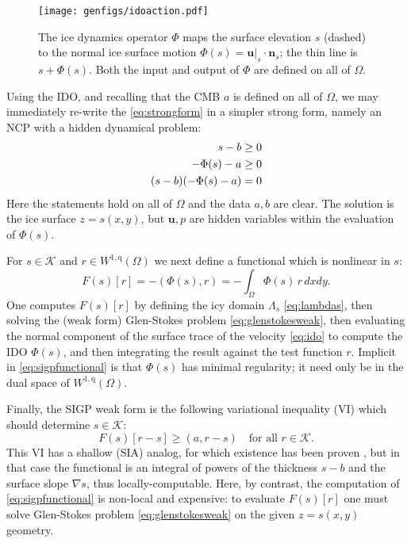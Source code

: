 \documentclass[letterpaper,final,12pt,reqno]{amsart}
\theoremstyle{claim}
\newcommand{\grad}{\nabla}
\newcommand{\bn}{\mathbf{n}}
\newcommand{\bu}{\mathbf{u}}
\newcommand{\ip}[2]{\left(#1,#2\right)}
\newcommand{\qq}{{\text{q}}}
\numberwithin{equation}{section}
\numberwithin{figure}{section}
\numberwithin{table}{section}
\numberwithin{theorem}{section}
\begin{document}
\begin{figure}[t]
\begin{center}
\texttt{[image: genfigs/idoaction.pdf]}
\end{center}
\caption{The ice dynamics operator $\Phi$ maps the surface elevation $s$ (dashed) to the normal ice surface motion $\Phi(s)=\bu|_s \cdot \bn_s$; the thin line is $s+\Phi(s)$.  Both the input and output of $\Phi$ are defined on all of $\Omega$.}
\label{fig:idoaction}
\end{figure}

Using the IDO, and recalling that the CMB $a$ is defined on all of $\Omega$, we may immediately re-write the \eqref{eq:strongform} in a simpler strong form, namely an NCP with a hidden dynamical problem:
\begin{align}
s - b &\ge 0  \label{eq:idostrongform} \\
- \Phi(s) - a &\ge 0 \notag \\
(s - b) (- \Phi(s) - a) &= 0 \notag
\end{align}
Here the statements hold on all of $\Omega$ and the data $a,b$ are clear.  The solution is the ice surface $z=s(x,y)$, but $\bu,p$ are hidden variables within the evaluation of $\Phi(s)$.

For $s \in \mathcal{K}$ and $r \in W^{1,\qq}(\Omega)$ we next define a functional which is nonlinear in $s$:
\begin{equation}
F(s)[r] = - \ip{\Phi(s)}{r} = - \int_\Omega \Phi(s)\, r \,dx dy. \label{eq:sigpfunctional}
\end{equation}
One computes $F(s)[r]$ by defining the icy domain $\Lambda_s$ \eqref{eq:lambdas}, then solving the (weak form) Glen-Stokes problem \eqref{eq:glenstokesweak}, then evaluating the normal component of the surface trace of the velocity \eqref{eq:ido} to compute the IDO $\Phi(s)$, and then integrating the result against the test function $r$.  Implicit in \eqref{eq:sigpfunctional} is that $\Phi(s)$ has minimal regularity; it need only be in the dual space of $W^{1,\qq}(\Omega)$.

Finally, the SIGP weak form is the following variational inequality (VI) \cite{KinderlehrerStampacchia1980} which should determine $s\in\mathcal{K}$:
\begin{equation}
F(s)[r - s] \ge \ip{a}{r-s} \quad \text{for all $r \in \mathcal{K}$.}  \label{eq:sigpweakform}
\end{equation}
This VI has a shallow (SIA) analog, for which existence has been proven \cite{JouvetBueler2012}, but in that case the functional is an integral of powers of the thickness $s-b$ and the surface slope $\grad s$, thus locally-computable.  Here, by contrast, the computation of \eqref{eq:sigpfunctional} is non-local and expensive: to evaluate $F(s)[r]$ one must solve Glen-Stokes problem \eqref{eq:glenstokesweak} on the given $z=s(x,y)$ geometry.
\end{document}
